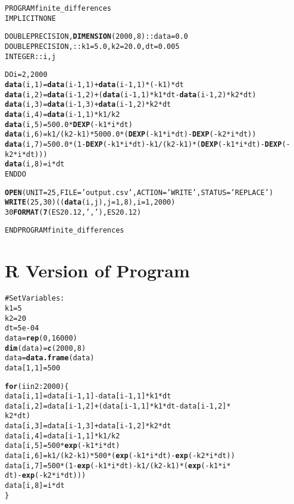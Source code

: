 \documentclass[10pt]{article}\usepackage{graphicx, color}
\makeatletter
\newcommand{\hlfunctioncall}[1]{\textcolor[rgb]{0.501960784313725,0,0.329411764705882}{\textbf{#1}}}%
\newcommand{\hlstring}[1]{\textcolor[rgb]{0.6,0.6,1}{#1}}%
\newcommand{\hlcomment}[1]{\textcolor[rgb]{0.180392156862745,0.6,0.341176470588235}{#1}}%
\newenvironment{kframe}{%
 \def\at@end@of@kframe{}%
 \ifinner\ifhmode%
  \def\at@end@of@kframe{\end{minipage}}%
  \begin{minipage}{\columnwidth}%
 \fi\fi%
 \def\FrameCommand##1{\hskip\@totalleftmargin \hskip-\fboxsep
 \colorbox{shadecolor}{##1}\hskip-\fboxsep
     \hskip-\linewidth \hskip-\@totalleftmargin \hskip\columnwidth}%
 \MakeFramed {\advance\hsize-\width
   \@totalleftmargin\z@ \linewidth\hsize
   \@setminipage}}%
 {\par\unskip\endMakeFramed%
 \at@end@of@kframe}
\newenvironment{knitrout}{}{} %
\makeatother
\begin{document}
\begin{kframe}
\begin{alltt}
PROGRAM finite_differences
IMPLICIT NONE

DOUBLE PRECISION, \hlfunctioncall{DIMENSION} (2000,8) :: data=0.0
DOUBLE PRECISION, :: k1=5.0, k2=20.0, dt=0.005
INTEGER :: i, j

DO i=2, 2000
  \hlfunctioncall{data}(i,1) = \hlfunctioncall{data}(i-1,1) + \hlfunctioncall{data}(i-1,1)*(-k1)*dt
  \hlfunctioncall{data}(i,2) = \hlfunctioncall{data}(i-1,2) + (\hlfunctioncall{data}(i-1,1)*k1*dt - \hlfunctioncall{data}(i-1,2)*k2*dt)
  \hlfunctioncall{data}(i,3) = \hlfunctioncall{data}(i-1,3) + \hlfunctioncall{data}(i-1,2)*k2*dt
  \hlfunctioncall{data}(i,4) = \hlfunctioncall{data}(i-1,1)*k1/k2
  \hlfunctioncall{data}(i,5) = 500.0*\hlfunctioncall{DEXP}(-k1*i*dt)
  \hlfunctioncall{data}(i,6) = k1/(k2-k1)*5000.0*( \hlfunctioncall{DEXP}(-k1*i*dt) - \hlfunctioncall{DEXP}(-k2*i*dt) )
  \hlfunctioncall{data}(i,7) = 500.0*( 1- \hlfunctioncall{DEXP}(-k1*i*dt) - k1/(k2-k1) * (\hlfunctioncall{DEXP}(-k1*i*dt)-\hlfunctioncall{DEXP}(-k2*i*dt) ) )
  \hlfunctioncall{data}(i,8) = i*dt
END DO

\hlfunctioncall{OPEN}(UNIT=25, FILE=\hlstring{'output.csv'}, ACTION=\hlstring{'WRITE'}, STATUS=\hlstring{'REPLACE'})
\hlfunctioncall{WRITE}(25,30) ( (\hlfunctioncall{data}(i,j), j=1, 8), i=1, 2000)
30 \hlfunctioncall{FORMAT} ( \hlfunctioncall{7}(ES20.12, \hlstring{','}), ES20.12)

END PROGRAM finite_differences
\end{alltt}
\end{kframe}


\section{R Version of Program}

\begin{knitrout}
\color{fgcolor}\begin{kframe}
\begin{alltt}
\hlcomment{# Set Variables:}
k1 = 5
k2 = 20
dt = 5e-04
data = \hlfunctioncall{rep}(0, 16000)
\hlfunctioncall{dim}(data) = \hlfunctioncall{c}(2000, 8)
data = \hlfunctioncall{data.frame}(data)
data[1, 1] = 500

\hlfunctioncall{for} (i in 2:2000) \{
    data[i, 1] = data[i - 1, 1] - data[i - 1, 1] * k1 * dt
    data[i, 2] = data[i - 1, 2] + (data[i - 1, 1] * k1 * dt - data[i - 1, 2] * 
        k2 * dt)
    data[i, 3] = data[i - 1, 3] + data[i - 1, 2] * k2 * dt
    data[i, 4] = data[i - 1, 1] * k1/k2
    data[i, 5] = 500 * \hlfunctioncall{exp}(-k1 * i * dt)
    data[i, 6] = k1/(k2 - k1) * 500 * (\hlfunctioncall{exp}(-k1 * i * dt) - \hlfunctioncall{exp}(-k2 * i * dt))
    data[i, 7] = 500 * (1 - \hlfunctioncall{exp}(-k1 * i * dt) - k1/(k2 - k1) * (\hlfunctioncall{exp}(-k1 * i * 
        dt) - \hlfunctioncall{exp}(-k2 * i * dt)))
    data[i, 8] = i * dt
\}
\end{alltt}
\end{kframe}
\end{knitrout}
\end{document}

